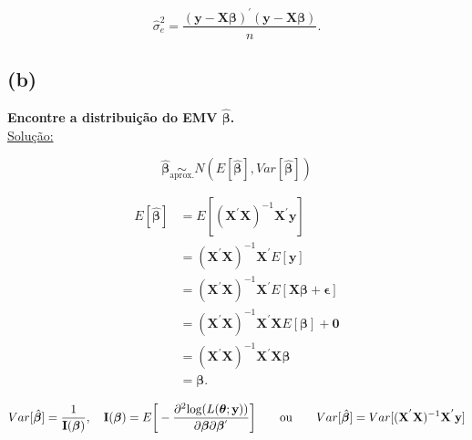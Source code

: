 \documentclass[12pt, oldfontcommands]{article}\usepackage[]{graphicx}\usepackage[]{color}
\begin{document}
\[\boxed{\hat{\sigma}_{e}^{2} = \frac{
         (\mathbf{y} - \mathbf{X} \bm{\beta})^{'}
         (\mathbf{y} - \mathbf{X} \bm{\beta})}{n}.} \]

\subsection*{(b)} 

\textbf{Encontre a distribuição do EMV \(\hat{\bm{\beta}}\).} \\

\underline{Solução:}

\[ \hat{\bm{\beta}} \underset{\text{aprox.}}{\sim}
    N(E[\hat{\bm{\beta}}], Var[\hat{\bm{\beta}}]) \]

\begin{align*}
 E[\hat{\bm{\beta}}] & =
 E[(\mathbf{X}^{'}\mathbf{X})^{-1}\mathbf{X}^{'}\mathbf{y}] \\ & =
 (\mathbf{X}^{'}\mathbf{X})^{-1}\mathbf{X}^{'}E[\mathbf{y}] \\ & =
 (\mathbf{X}^{'}\mathbf{X})^{-1}\mathbf{X}^{'}
 E[\mathbf{X} \bm{\beta} + \bm{\epsilon}] \\ & =
 (\mathbf{X}^{'}\mathbf{X})^{-1}\mathbf{X}^{'}\mathbf{X}E[\bm{\beta}] +
 \mathbf{0} \\ & = (\mathbf{X}^{'}\mathbf{X})^{-1}
 \mathbf{X}^{'}\mathbf{X}\bm{\beta} \\ & = \bm{\beta}.
\end{align*}

\[ Var[\hat{\bm{\beta}}] = \frac{1}{\mathbf{I}(\bm{\beta})},
   \hspace{.35cm} \mathbf{I}(\bm{\beta}) = E\bigg[-\frac{\partial^2
   {\rm log}(L(\bm{\theta};\mathbf{y}))}{\partial \bm{\beta} \partial
   \bm{\beta}^{'}}\bigg] \qquad \text{ou} \qquad Var[\hat{\bm{\beta}}] =
   Var[(\mathbf{X}^{'}\mathbf{X})^{-1}\mathbf{X}^{'}\mathbf{y}] \]
\end{document}
